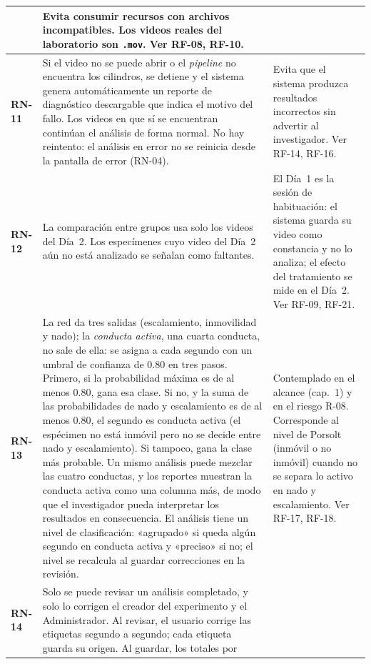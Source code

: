 \begin{longtable}{|>{\bfseries}p{1.1cm}|>{\raggedright}p{8.1cm}|>{\raggedright\arraybackslash}p{3.9cm}|}
      & Evita consumir recursos con archivos incompatibles. Los videos reales del
        laboratorio son \texttt{.mov}. Ver RF-08, RF-10. \\
\hline
RN-11 & Si el video no se puede abrir o el \textit{pipeline} no encuentra los cilindros, se
        detiene y el sistema genera automáticamente un reporte de diagnóstico
        descargable que indica el motivo del fallo. Los videos en que sí se
        encuentran continúan el análisis de forma normal. No hay reintento: el análisis
        en error no se reinicia desde la pantalla de error (RN-04).
      & Evita que el sistema produzca resultados incorrectos sin advertir al
        investigador. Ver RF-14, RF-16. \\
\hline
RN-12 & La comparación entre grupos usa solo los videos del Día~2. Los
        especímenes cuyo video del Día~2 aún no está analizado se señalan como
        faltantes.
      & El Día~1 es la sesión de habituación: el sistema guarda su video como
        constancia y no lo analiza; el efecto del tratamiento se mide en el Día~2.
        Ver RF-09, RF-21. \\
\hline
RN-13 & La red da tres salidas (escalamiento, inmovilidad y nado); la
        \textit{conducta activa}, una cuarta conducta, no sale de ella: se asigna a cada
        segundo con un umbral de confianza de 0.80 en tres pasos. Primero, si la
        probabilidad máxima es de al menos 0.80, gana esa clase. Si no, y la suma de las
        probabilidades de nado y escalamiento es de al menos 0.80, el segundo es conducta
        activa (el espécimen no está inmóvil pero no se decide entre nado y
        escalamiento). Si tampoco, gana la clase más probable. Un mismo análisis puede
        mezclar las cuatro conductas, y los reportes muestran la conducta activa
        como una columna más, de modo que el investigador pueda interpretar los
        resultados en consecuencia. El análisis tiene un nivel de clasificación:
        «agrupado» si queda algún segundo en conducta activa y «preciso» si no; el nivel
        se recalcula al guardar correcciones en la revisión.
      & Contemplado en el alcance (cap.~1) y en el riesgo R-08. Corresponde al
        nivel de Porsolt (inmóvil o no inmóvil) cuando no se separa lo activo en
        nado y escalamiento. Ver RF-17, RF-18. \\
\hline
RN-14 & Solo se puede revisar un análisis completado, y solo lo corrigen el
        creador del experimento y el Administrador. Al revisar, el usuario corrige
        las etiquetas segundo a segundo; cada etiqueta guarda su origen. Al guardar, los totales por

\end{longtable}
